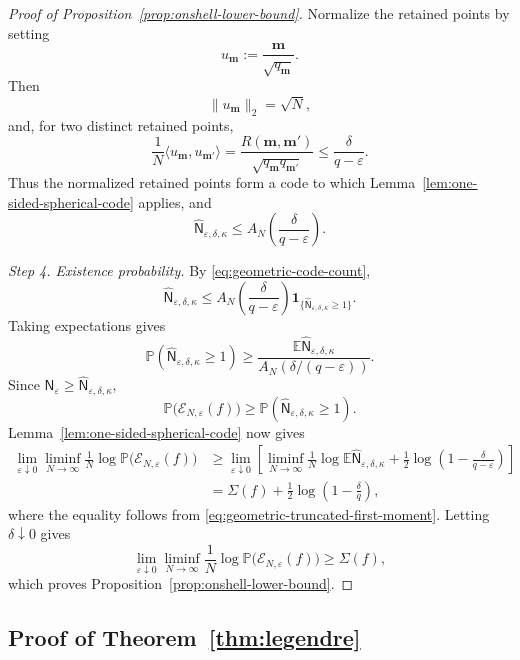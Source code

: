 \documentclass[a4paper,10pt,reqno]{amsart}
\numberwithin{equation}{section}
\newcommand{\ve}{\varepsilon}
\newcommand{\dP}{\mathbb{P}}%
\newcommand{\dE}{\mathbb{E}}%
\newcommand{\mc}{\mathcal}
\newcommand{\bfm}{\mathbf{m}}
\begin{document}
\begin{proof}[Proof of Proposition~\ref{prop:onshell-lower-bound}]
		Normalize the retained points by setting
		\[
		u_\bfm:=\frac{\bfm}{\sqrt{q_\bfm}}.
		\]
		Then
		\[
		\|u_\bfm\|_2=\sqrt N,
		\]
		and, for two distinct retained points,
		\[
		\frac1N
		\langle u_\bfm,u_{\bfm'}\rangle
		=
		\frac{R(\bfm,\bfm')}
		{\sqrt{q_\bfm q_{\bfm'}}}
		\le
		\frac{\delta}{q-\ve}.
		\]
		Thus the normalized retained points form a code to which
		Lemma~\ref{lem:one-sided-spherical-code} applies, and
		\begin{equation}\label{eq:geometric-code-count}
			\widehat{\mathsf N}_{\ve,\delta,\kappa}
			\le
			A_N\left(
			\frac{\delta}{q-\ve}
			\right).
		\end{equation}
		
		\medskip\noindent\emph{Step 4. Existence probability.}
		By \eqref{eq:geometric-code-count},
		\[
		\widehat{\mathsf N}_{\ve,\delta,\kappa}
		\le
		A_N\left(
		\frac{\delta}{q-\ve}
		\right)
		\boldsymbol 1_{
			\{\widehat{\mathsf N}_{\ve,\delta,\kappa}\ge1\}
		}.
		\]
		Taking expectations gives
		\[
		\dP\left(
		\widehat{\mathsf N}_{\ve,\delta,\kappa}\ge1
		\right)
		\ge
		\frac{
			\dE\widehat{\mathsf N}_{\ve,\delta,\kappa}
		}{
			A_N\left(\delta/(q-\ve)\right)
		}.
		\]
		Since
		\(\mathsf N_\ve
		\ge\widehat{\mathsf N}_{\ve,\delta,\kappa}\),
		\[
		\dP\bigl(\mc E_{N,\ve}(f)\bigr)
		\ge
		\dP\left(
		\widehat{\mathsf N}_{\ve,\delta,\kappa}\ge1
		\right).
		\]
		Lemma~\ref{lem:one-sided-spherical-code} now gives
		\[
		\begin{aligned}
			\lim_{\ve\downarrow0}
			\liminf_{N\to\infty}
			\frac1N
			\log
			\dP\bigl(\mc E_{N,\ve}(f)\bigr)
			&\ge
			\lim_{\ve\downarrow0}
			\left[
			\liminf_{N\to\infty}
			\frac1N
			\log\dE\widehat{\mathsf N}_{\ve,\delta,\kappa}
			+
			\frac12\log\left(
			1-\frac{\delta}{q-\ve}
			\right)
			\right]\\
			&=
			\Sigma(f)
			+
			\frac12\log\left(1-\frac{\delta}{q}\right),
		\end{aligned}
		\]
		where the equality follows from
		\eqref{eq:geometric-truncated-first-moment}. Letting \(\delta\downarrow0\)
		gives
		\[
		\lim_{\ve\downarrow0}
		\liminf_{N\to\infty}
		\frac1N
		\log
		\dP\bigl(\mc E_{N,\ve}(f)\bigr)
		\ge
		\Sigma(f),
		\]
		which proves Proposition~\ref{prop:onshell-lower-bound}.
	\end{proof}
	
	\subsection{Proof of Theorem~\ref{thm:legendre}}
	
\end{document}
